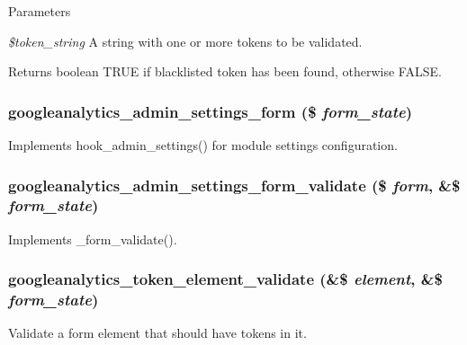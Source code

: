 \begin{DoxyParams}{Parameters}
\item[{\em \$token\_\-string}]A string with one or more tokens to be validated. \end{DoxyParams}
\begin{DoxyReturn}{Returns}
boolean TRUE if blacklisted token has been found, otherwise FALSE. 
\end{DoxyReturn}
\hypertarget{googleanalytics_8admin_8inc_abc6ca2b209feb9090c8ab26d6ca059c4}{
\subsubsection[{googleanalytics\_\-admin\_\-settings\_\-form}]{\setlength{\rightskip}{0pt plus 5cm}googleanalytics\_\-admin\_\-settings\_\-form (\$ {\em form\_\-state})}}
\label{googleanalytics_8admin_8inc_abc6ca2b209feb9090c8ab26d6ca059c4}
Implements hook\_\-admin\_\-settings() for module settings configuration. \hypertarget{googleanalytics_8admin_8inc_a41b564fb7aed5ae2811eddf2955eb13e}{
\subsubsection[{googleanalytics\_\-admin\_\-settings\_\-form\_\-validate}]{\setlength{\rightskip}{0pt plus 5cm}googleanalytics\_\-admin\_\-settings\_\-form\_\-validate (\$ {\em form}, \/  \&\$ {\em form\_\-state})}}
\label{googleanalytics_8admin_8inc_a41b564fb7aed5ae2811eddf2955eb13e}
Implements \_\-form\_\-validate(). \hypertarget{googleanalytics_8admin_8inc_a54d8df69a1b0518237288949dfbfdb42}{
\subsubsection[{googleanalytics\_\-token\_\-element\_\-validate}]{\setlength{\rightskip}{0pt plus 5cm}googleanalytics\_\-token\_\-element\_\-validate (\&\$ {\em element}, \/  \&\$ {\em form\_\-state})}}
\label{googleanalytics_8admin_8inc_a54d8df69a1b0518237288949dfbfdb42}
Validate a form element that should have tokens in it.

